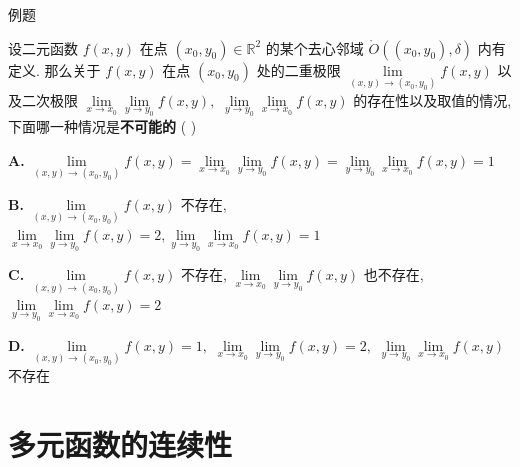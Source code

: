 \begin{frame}{例题}

\begin{eg}[2024年期末考试题目]
设二元函数 $f(x, y)$ 在点 $(x_0, y_0) \in \mathbb{R}^2$ 的某个去心邻域 $\mathring{O}((x_0, y_0), \delta)$ 内有定义. 那么关于 $f(x, y)$ 在点 $(x_0, y_0)$ 处的二重极限 $\lim\limits_{(x,y)\to(x_0,y_0)} f(x,y)$ 以及二次极限 $\lim\limits_{x \to x_0} \lim\limits_{y \to y_0} f(x,y),$ $\lim\limits_{y \to y_0} \lim\limits_{x \to x_0} f(x,y)$ 的存在性以及取值的情况, 下面哪一种情况是\textbf{不可能的} ( )

\vspace{0.5em}

\textbf{A.} $\lim\limits_{(x,y)\to(x_0,y_0)} f(x,y) = \lim\limits_{x \to x_0} \lim\limits_{y \to y_0} f(x,y) = \lim\limits_{y \to y_0} \lim\limits_{x \to x_0} f(x,y) = 1$

\vspace{0.5em}
\textbf{B.} $\lim\limits_{(x,y)\to(x_0,y_0)} f(x,y)$ 不存在, $\lim\limits_{x \to x_0} \lim\limits_{y \to y_0} f(x,y) = 2, \lim\limits_{y \to y_0} \lim\limits_{x \to x_0} f(x,y) = 1$

\vspace{0.5em}
\textbf{C.} $\lim\limits_{(x,y)\to(x_0,y_0)} f(x,y)$ 不存在, $\lim\limits_{x \to x_0} \lim\limits_{y \to y_0} f(x,y)$ 也不存在, $\lim\limits_{y \to y_0} \lim\limits_{x \to x_0} f(x,y) = 2$

\vspace{0.5em}
\textbf{D.} $\lim\limits_{(x,y)\to(x_0,y_0)} f(x,y) = 1,$ $\lim\limits_{x \to x_0} \lim\limits_{y \to y_0} f(x,y) = 2,$ $\lim\limits_{y \to y_0} \lim\limits_{x \to x_0} f(x,y)$ 不存在
\end{eg}

\vspace{1em}


\end{frame}


\section{多元函数的连续性}


